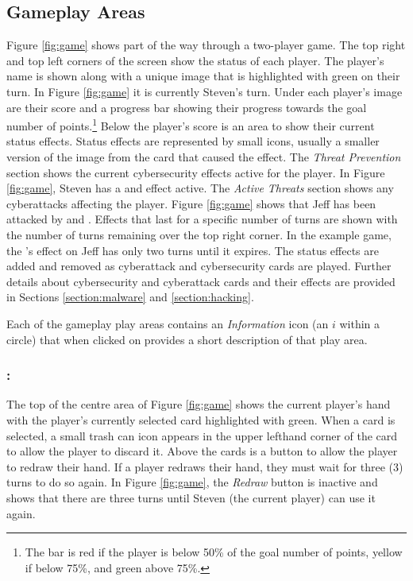 \subsection{Gameplay Areas}

Figure \ref{fig:game} shows part of the way through a two-player game. The top right and top left corners of the screen show the status of each player. The player's name is shown along with a unique image that is highlighted with green on their turn. In Figure \ref{fig:game} it is currently Steven's turn. Under each player's image are their score and a progress bar showing their progress towards the goal number of points.\footnote{The bar is red if the player is below 50\% of the goal number of points, yellow if below 75\%, and green above 75\%.} Below the player's score is an area to show their current status effects. Status effects are represented by small icons, usually a smaller version of the image from the card that caused the effect. The \emph{Threat Prevention} section shows the current cybersecurity effects active for the player. In Figure \ref{fig:game}, Steven has a \Scan and \Anti effect active. The \emph{Active Threats} section shows any cyberattacks affecting the player. Figure \ref{fig:game} shows that Jeff has been attacked by \Ran and \Spyns. Effects that last for a specific number of turns are shown with the number of turns remaining over the top right corner. In the example game, the \Spyns 's effect on Jeff has only two turns until it expires. The status effects are added and removed as cyberattack and cybersecurity cards are played. Further details about cybersecurity and cyberattack cards and their effects are provided in Sections \ref{section:malware} and \ref{section:hacking}.

Each of the gameplay play areas contains an \emph{Information} icon (an $i$ within a circle) that when clicked on provides a short description of that play area.

\subsubsection{\Hand:}
The top of the centre area of Figure \ref{fig:game} shows the current player's hand with the player's currently selected card highlighted with green. When a card is selected, a small trash can icon appears in the upper lefthand corner of the card to allow the player to discard it. Above the cards is a button to allow the player to redraw their hand. If a player redraws their hand, they must wait for three (3) turns to do so again. In Figure \ref{fig:game}, the \emph{Redraw} button is inactive and shows that there are three turns until Steven (the current player) can use it again. 

